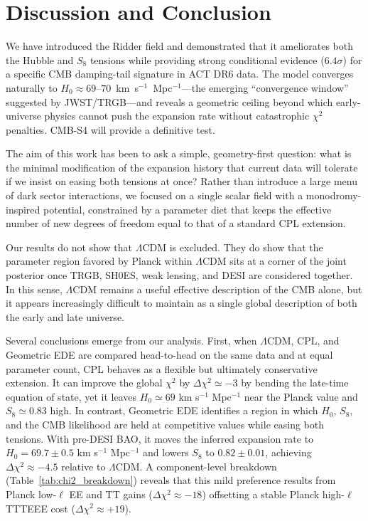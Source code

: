 \documentclass[a4paper,11pt]{article}
\begin{document}
\section{Discussion and Conclusion}

We have introduced the Ridder field and demonstrated that it ameliorates both the Hubble and $S_8$ tensions while providing strong conditional evidence ($6.4\sigma$) for a specific CMB damping-tail signature in ACT DR6 data. The model converges naturally to $H_0 \approx 69$--$70$~km~s$^{-1}$~Mpc$^{-1}$---the emerging ``convergence window'' suggested by JWST/TRGB---and reveals a geometric ceiling beyond which early-universe physics cannot push the expansion rate without catastrophic $\chi^2$ penalties. CMB-S4 will provide a definitive test.

The aim of this work has been to ask a simple, geometry-first question: what is the minimal modification of the expansion history that current data will tolerate if we insist on easing both tensions at once? Rather than introduce a large menu of dark sector interactions, we focused on a single scalar field with a monodromy-inspired potential, constrained by a parameter diet that keeps the effective number of new degrees of freedom equal to that of a standard CPL extension.

Our results do not show that $\Lambda$CDM is excluded. They do show that the parameter region favored by Planck within $\Lambda$CDM sits at a corner of the joint posterior once TRGB, SH0ES, weak lensing, and DESI are considered together. In this sense, $\Lambda$CDM remains a useful effective description of the CMB alone, but it appears increasingly difficult to maintain as a single global description of both the early and late universe.

Several conclusions emerge from our analysis. First, when $\Lambda$CDM, CPL, and Geometric EDE are compared head-to-head on the same data and at equal parameter count, CPL behaves as a flexible but ultimately conservative extension. It can improve the global $\chi^2$ by $\Delta\chi^2 \simeq -3$ by bending the late-time equation of state, yet it leaves $H_0 \simeq 69$ km s$^{-1}$ Mpc$^{-1}$ near the Planck value and $S_8 \simeq 0.83$ high. In contrast, Geometric EDE identifies a region in which $H_0$, $S_8$, and the CMB likelihood are held at competitive values while easing both tensions. With pre-DESI BAO, it moves the inferred expansion rate to $H_0 = 69.7 \pm 0.5$ km s$^{-1}$ Mpc$^{-1}$ and lowers $S_8$ to $0.82 \pm 0.01$, achieving $\Delta\chi^2 \approx -4.5$ relative to $\Lambda$CDM. A component-level breakdown (Table~\ref{tab:chi2_breakdown}) reveals that this mild preference results from Planck low-$\ell$ EE and TT gains ($\Delta\chi^2 \approx -18$) offsetting a stable Planck high-$\ell$ TTTEEE cost ($\Delta\chi^2 \approx +19$).
\end{document}
